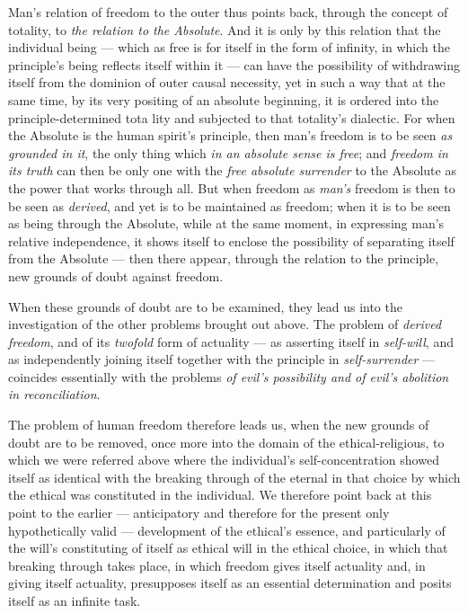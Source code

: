 \documentclass[12pt,a4paper]{book}
\begin{document}
Man's relation of freedom to the outer thus points back, through the concept of
totality, to \emph{the relation to the Absolute}. And it is only by this
relation that the individual being --- which as free is for itself in the form
of infinity, in which the principle's being reflects itself within it --- can
have the possibility of withdrawing itself from the dominion of outer causal
necessity, yet in such a way that at the same time, by its very positing of an
absolute beginning, it is ordered into the principle-determined tota\-%
lity and subjected to that totality's dialectic. For when the Absolute is the
human spirit's principle, then man's freedom is to be seen \emph{as grounded in
it}, the only thing which \emph{in an absolute sense is free}; and
\emph{freedom in its truth} can then be only one with the \emph{free absolute
surrender} to the Absolute as the power that works through all. But when
freedom as \emph{man's} freedom is then to be seen as \emph{derived}, and yet
is to be maintained as freedom; when it is to be seen as being through the
Absolute, while at the same moment, in expressing man's relative independence,
it shows itself to enclose the possibility of separating itself from the
Absolute --- then there appear, through the relation to the principle, new
grounds of doubt against freedom.

When these grounds of doubt are to be examined, they lead us into the
investigation of the other problems brought out above. The problem of
\emph{derived freedom}, and of its \emph{twofold} form of actuality --- as
asserting itself in \emph{self-will}, and as independently joining itself
together with the principle in \emph{self-surrender} --- coincides essentially
with the problems \emph{of evil's possibility and of evil's abolition in
reconciliation}.

The problem of human freedom therefore leads us, when the new grounds of doubt
are to be removed, once more into the domain of the ethical-religious, to which
we were referred above where the individual's self-concentration showed itself
as identical with the breaking through of the eternal in that choice by which
the ethical was constituted in the individual. We therefore point back at this
point to the earlier --- anticipatory and therefore for the present only
hypothetically valid --- development of the ethical's essence, and particularly
of the will's constituting of itself as ethical will in the ethical choice, in
which that breaking through takes place, in which freedom gives itself
actuality and, in giving itself actuality, presupposes itself as an essential
determination and posits itself as an infinite task.
\end{document}
